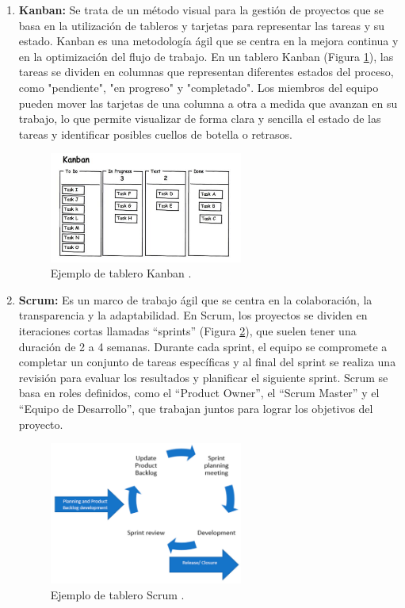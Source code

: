 \begin{enumerate}
    \item \textbf{Kanban:} Se trata de un método visual para la gestión de proyectos que se basa en la utilización de tableros y tarjetas para representar las tareas y su estado. Kanban es una metodología ágil que se centra en la mejora continua y en la optimización del flujo de trabajo. En un tablero Kanban (Figura \ref{fig:kanban}), las tareas se dividen en columnas que representan diferentes estados del proceso, como "pendiente", "en progreso" y "completado". Los miembros del equipo pueden mover las tarjetas de una columna a otra a medida que avanzan en su trabajo, lo que permite visualizar de forma clara y sencilla el estado de las tareas y identificar posibles cuellos de botella o retrasos.
    \begin{figure}[H]
        \centering
        \includegraphics[width=0.6\textwidth]{imagenes/kanban.png}
        \caption{Ejemplo de tablero Kanban \cite{kirovska2015usage}.}
        \label{fig:kanban}
    \end{figure}
    \item \textbf{Scrum:} Es un marco de trabajo ágil que se centra en la colaboración, la transparencia y la adaptabilidad. En Scrum, los proyectos se dividen en iteraciones cortas llamadas ``sprints'' (Figura \ref{fig:scrum}), que suelen tener una duración de 2 a 4 semanas. Durante cada sprint, el equipo se compromete a completar un conjunto de tareas específicas y al final del sprint se realiza una revisión para evaluar los resultados y planificar el siguiente sprint. Scrum se basa en roles definidos, como el ``Product Owner'', el ``Scrum Master'' y el ``Equipo de Desarrollo'', que trabajan juntos para lograr los objetivos del proyecto.
    \begin{figure}[H]
        \centering
        \includegraphics[width=0.6\textwidth]{imagenes/scrum.png}
        \caption{Ejemplo de tablero Scrum \cite{karabiyik2020understanding}.}
        \label{fig:scrum}
    \end{figure}
\end{enumerate}

